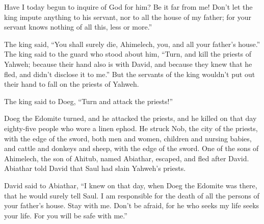 {Have I today begun to inquire of God for him? Be it far from me! Don’t let the king impute anything to his servant, nor to all the house of my father; for your servant knows nothing of all this, less or more.”
\par }{\PP {}The king said, “You shall surely die, Ahimelech, you, and all your father’s house.”
The king said to the guard who stood about him, “Turn, and kill the priests of Yahweh; because their hand also is with David, and because they knew that he fled, and didn’t disclose it to me.” But the servants of the king wouldn’t put out their hand to fall on the priests of Yahweh.
\par }{\PP {}The king said to Doeg, “Turn and attack the priests!”
\par }{\PP Doeg the Edomite turned, and he attacked the priests, and he killed on that day eighty-five people who wore a linen ephod.
He struck Nob, the city of the priests, with the edge of the sword, both men and women, children and nursing babies, and cattle and donkeys and sheep, with the edge of the sword.
One of the sons of Ahimelech, the son of Ahitub, named Abiathar, escaped, and fled after David.
Abiathar told David that Saul had slain Yahweh’s priests.
\par }{\PP {}David said to Abiathar, “I knew on that day, when Doeg the Edomite was there, that he would surely tell Saul. I am responsible for the death of all the persons of your father’s house.
Stay with me. Don’t be afraid, for he who seeks my life seeks your life. For you will be safe with me.”

}
